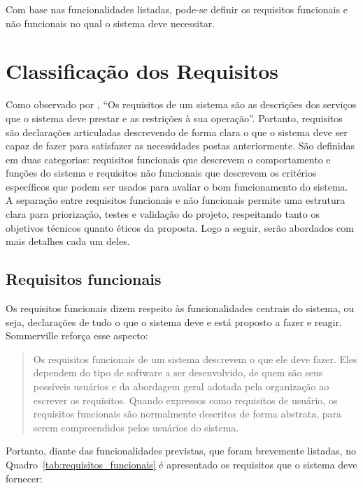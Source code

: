 Com base nas funcionalidades listadas, pode-se definir os requisitos funcionais
e não funcionais no qual o sistema deve necessitar.

\section{Classificação dos Requisitos}

Como observado por \cite[p.~58]{sommerville:2010}, ``Os requisitos de um sistema são
as descrições dos serviços que o sistema deve prestar e as restrições à sua
operação''. Portanto, requisitos são declarações articuladas descrevendo de
forma clara o que o sistema deve ser capaz de fazer para satisfazer as
necessidades postas anteriormente. São definidas em duas categorias: requisitos
funcionais que descrevem o comportamento e funções do sistema e requisitos não
funcionais que descrevem os critérios específicos que podem ser usados para
avaliar o bom funcionamento do sistema. A separação entre requisitos funcionais
e não funcionais permite uma estrutura clara para priorização, testes e
validação do projeto, respeitando tanto os objetivos técnicos quanto éticos da
proposta. Logo a seguir, serão abordados com mais detalhes cada um deles.

\subsection{Requisitos funcionais}

Os requisitos funcionais dizem respeito às funcionalidades centrais do sistema,
ou seja, declarações de tudo o que o sistema deve e está proposto a fazer e
reagir. Sommerville reforça esse aspecto:

\begin{quote}

  Os requisitos funcionais de um sistema descrevem o que ele deve fazer. Eles
  dependem do tipo de software a ser desenvolvido, de quem são seus possíveis
  usuários e da abordagem geral adotada pela organização ao escrever os
  requisitos. Quando expressos como requisitos de usuário, os requisitos
  funcionais são normalmente descritos de forma abstrata, para serem
  compreendidos pelos usuários do sistema.

  \cite[p.~59]{sommerville:2010}
\end{quote}

Portanto, diante das funcionalidades previstas, que foram brevemente listadas,
no Quadro~\ref{tab:requisitos_funcionais} é apresentado os requisitos que o
sistema deve fornecer:

